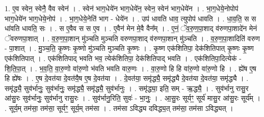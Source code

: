 \documentclass[17pt]{extarticle}
\begin{document}
1. ए॒व स्वेन॒ स्वेनै॒ वैव स्वेन॑ । . स्वेन॑ भाग॒धेये॑न भाग॒धेये॑न॒ स्वेन॒ स्वेन॑ भाग॒धेये॑न । . भा॒ग॒धेये॒नोपोप॑ भाग॒धेये॑न भाग॒धेये॒नोप॑ । . भा॒ग॒धेये॒नेति॑ भाग - धेये॑न । . उप॑ धावति धाव॒ त्युपोप॑ धावति । . धा॒व॒ति॒ स स धा॑वति धावति॒ सः । . स ए॒वैव स स ए॒व । . ए॒वैन॑ मेन मे॒वै वैन᳚म् । . ए॒नं॒ ॅव॒रु॒ण॒पा॒शाद् व॑रुणपा॒शादे॑न मेनं ॅवरुणपा॒शात् । . व॒रु॒ण॒पा॒शान् मु॑ञ्चति मुञ्चति वरुणपा॒शाद् व॑रुणपा॒शान् मु॑ञ्चति । . व॒रु॒ण॒पा॒शादिति॑ वरुण - पा॒शात् । . मु॒ञ्च॒ति॒ कृ॒ष्णः कृ॒ष्णो मु॑ञ्चति मुञ्चति कृ॒ष्णः । . कृ॒ष्ण एक॑शितिपा॒ देक॑शितिपात् कृ॒ष्णः कृ॒ष्ण एक॑शितिपात् । . एक॑शितिपाद् भवति भव॒ त्येक॑शितिपा॒ देक॑शितिपाद् भवति । . एक॑शितिपा॒दित्येक॑ - शि॒ति॒पा॒त् । . भ॒व॒ति॒ वा॒रु॒णो वा॑रु॒णो भ॑वति भवति वारु॒णः । . वा॒रु॒णो हि हि वा॑रु॒णो वा॑रु॒णो हि । . ह्ये॑ष ए॒ष हि ह्ये॑षः । . ए॒ष दे॒वत॑या दे॒वत॑यै॒ष ए॒ष दे॒वत॑या । . दे॒वत॑या॒ समृ॑द्ध्यै॒ समृ॑द्ध्यै दे॒वत॑या दे॒वत॑या॒ समृ॑द्ध्यै । . समृ॑द्ध्यै॒ सुव॑र्भानुः॒ सुव॑र्भानुः॒ समृ॑द्ध्यै॒ समृ॑द्ध्यै॒ सुव॑र्भानुः । . समृ॑द्ध्या॒ इति॒ सम् - ऋ॒द्ध्यै॒ । . सुव॑र्भानु रासु॒र आ॑सु॒रः सुव॑र्भानुः॒ सुव॑र्भानु रासु॒रः । . सुव॑र्भानु॒रिति॒ सुवः॑ - भा॒नुः॒ । . आ॒सु॒रः सूर्यꣳ॒॒ सूर्य॑ मासु॒र आ॑सु॒रः सूर्य᳚म् । . सूर्य॒म् तम॑सा॒ तम॑सा॒ सूर्यꣳ॒॒ सूर्य॒म् तम॑सा । . तम॑सा ऽविद्ध्य दविद्ध्य॒त् तम॑सा॒ तम॑सा ऽविद्ध्यत् । \newline
\end{document}
